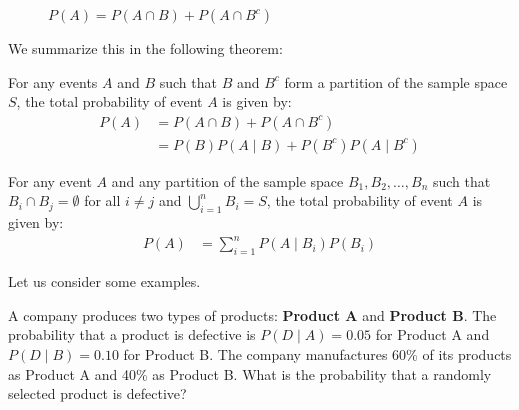 \begin{figure}[htbp]
    \centering
        \caption{$P(A)=P(A \cap B)+P(A \cap B^c)$}
        \label{fig:decoA}
\end{figure}

We summarize this in the following theorem:

\begin{theorem}
For any events \( A \) and \( B \) such that \( B \) and \( B^c \) form a partition of the sample space \( S \), the total probability of event \( A \) is given by:
    \begin{align*}
    P(A) &= P(A \cap B) + P(A \cap B^c) \\
    &= P(B) P(A \mid B) + P(B^c) P(A \mid B^c)
    \end{align*}

    For any event \( A \) and any partition of the sample space \( B_1, B_2, \ldots, B_n \) such that \( B_i \cap B_j = \emptyset \) for all \( i \neq j \) and \( \bigcup_{i=1}^{n} B_i = S \), the total probability of event \( A \) is given by:
    \begin{align*}
    P(A) &= \sum_{i=1}^{n} P(A \mid B_i) P(B_i)
    \end{align*}
\end{theorem}

Let us consider some examples.

\begin{example}
    A company produces two types of products: \textbf{Product A} and \textbf{Product B}. The probability that a product is defective is \( P(D \mid A) = 0.05 \) for Product A and \( P(D \mid B) = 0.10 \) for Product B. The company manufactures 60\% of its products as Product A and 40\% as Product B. What is the probability that a randomly selected product is defective?
\end{example}

